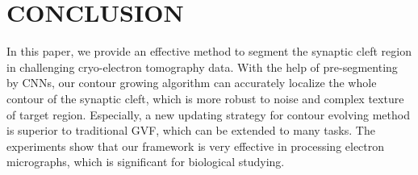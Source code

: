 \documentclass{article}
\begin{document}
\section{CONCLUSION}
\label{sec:conclusion}
In this paper, we provide an effective method to segment the synaptic cleft region in challenging cryo-electron tomography data.
With the help of pre-segmenting by CNNs, our contour growing algorithm can accurately localize the whole contour of the synaptic cleft, which is more robust to noise and complex texture of target region.
Especially, a new updating strategy for contour evolving method is superior to traditional GVF, which can be extended to many tasks.
The experiments show that our framework is very effective in processing electron micrographs, which is significant for biological studying.

%
%


\end{document}
